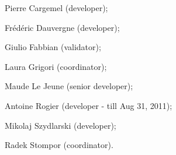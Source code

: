 \begin{DoxyItemize}
\item Pierre Cargemel (developer); \item Fr\'{e}d\'{e}ric Dauvergne (developer); \item Giulio Fabbian (validator); \item Laura Grigori (coordinator); \item Maude Le Jeune (senior developer); \item Antoine Rogier (developer -\/ till Aug 31, 2011); \item Mikolaj Szydlarski (developer); \item Radek Stompor (coordinator). \end{DoxyItemize}
